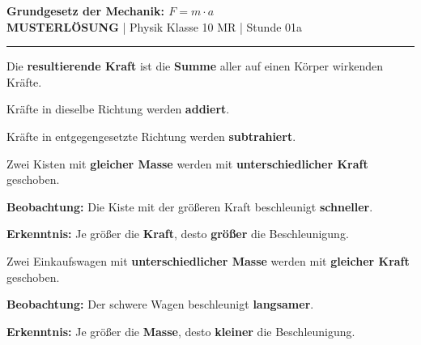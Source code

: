\documentclass[11pt, a4paper]{article}
\newcommand{\fach}{Physik}
\newcommand{\thema}{Grundgesetz der Mechanik}
\newcommand{\klasse}{10 MR}
\newcommand{\stunde}{01a}
\newcommand{\lsg}[1]{\textcolor{loesung}{\textbf{#1}}}
\begin{document}

\begin{center}
    {\Large\bfseries\textcolor{fachfarbe}{\thema: $F = m \cdot a$}}\\[0.2em]
    {\small \textcolor{loesung}{\textbf{MUSTERLÖSUNG}} | \fach{} Klasse \klasse{} | Stunde \stunde}
\end{center}
\vspace{-0.3em}
\hrule
\vspace{0.6em}


\begin{merkkasten}[title={\textbf{Kasten 1: Resultierende Kraft}}]
Die \textbf{resultierende Kraft} ist die \lsg{Summe} aller auf einen Körper wirkenden Kräfte.

\vspace{0.3em}
Kräfte in dieselbe Richtung werden \lsg{addiert}.

Kräfte in entgegengesetzte Richtung werden \lsg{subtrahiert}.
\end{merkkasten}


\begin{merkkasten}[title={\textbf{Kasten 2a: Erkenntnis – Kraft und Beschleunigung}}]
Zwei Kisten mit \textbf{gleicher Masse} werden mit \textbf{unterschiedlicher Kraft} geschoben.

\vspace{0.3em}
\textbf{Beobachtung:} Die Kiste mit der größeren Kraft beschleunigt \lsg{schneller}.

\vspace{0.3em}
\textbf{Erkenntnis:} Je größer die \textbf{Kraft}, desto \lsg{größer} die Beschleunigung.
\end{merkkasten}


\begin{merkkasten}[title={\textbf{Kasten 2b: Erkenntnis – Masse und Beschleunigung}}]
Zwei Einkaufswagen mit \textbf{unterschiedlicher Masse} werden mit \textbf{gleicher Kraft} geschoben.

\vspace{0.3em}
\textbf{Beobachtung:} Der schwere Wagen beschleunigt \lsg{langsamer}.

\vspace{0.3em}
\textbf{Erkenntnis:} Je größer die \textbf{Masse}, desto \lsg{kleiner} die Beschleunigung.
\end{merkkasten}
\end{document}
